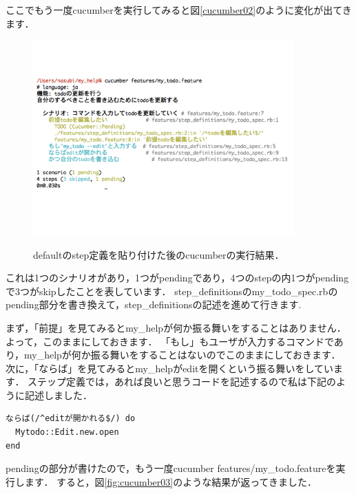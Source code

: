 ここでもう一度cucumberを実行してみると図\ref{cucumber02}のように変化が出てきます．

\begin{figure}[htbp]\begin{center}
\includegraphics[width=10cm,bb= 0 0 737 553]{../figs/./cucumber02.001.jpg}
\caption{defaultのstep定義を貼り付けた後のcucumberの実行結果．}
\label{fig:cucumber02}
\label{default}\end{center}\end{figure}
これは1つのシナリオがあり，1つがpendingであり，4つのstepの内1つがpendingで3つがskipしたことを表しています．
step\_definitionsのmy\_todo\_spec.rbのpending部分を書き換えて，step\_definitionsの記述を進めて行きます.

まず，「前提」を見てみるとmy\_helpが何か振る舞いをすることはありません．
よって，このままにしておきます．
「もし」もユーザが入力するコマンドであり，my\_helpが何か振る舞いをすることはないのでこのままにしておきます．
次に，「ならば」を見てみるとmy\_helpがeditを開くという振る舞いをしています．
ステップ定義では，あれば良いと思うコードを記述するので私は下記のように記述しました．
\begin{lstlisting}[style=customCsh,basicstyle={\scriptsize\ttfamily}]
ならば(/^editが開かれる$/) do
  Mytodo::Edit.new.open
end
\end{lstlisting}
pendingの部分が書けたので，もう一度cucumber features/my\_todo.featureを実行します．
すると，図\ref{fig:cucumber03}のような結果が返ってきました．

